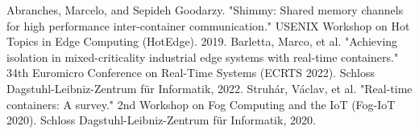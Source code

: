 \documentclass[a4paper, 10pt]{article}
\theoremstyle{nonumberplain}
\begin{document}
% 

\begin{thebibliography}{2}
     Abranches, Marcelo, and Sepideh Goodarzy.
        "Shimmy: Shared memory channels for high performance inter-container
        communication." USENIX Workshop on Hot Topics in Edge Computing
        (HotEdge). 2019.
        Barletta, Marco, et al. "Achieving isolation in mixed-criticality
        industrial edge systems with real-time containers." 34th Euromicro
        Conference on Real-Time Systems (ECRTS 2022). Schloss
        Dagstuhl-Leibniz-Zentrum für Informatik, 2022.
        Struhár, Václav, et al. "Real-time containers: A survey."
        2nd Workshop on Fog Computing and the IoT (Fog-IoT 2020).
        Schloss Dagstuhl-Leibniz-Zentrum für Informatik, 2020.
\end{thebibliography}
\end{document}
